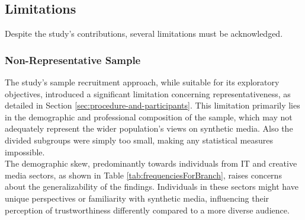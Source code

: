 \documentclass[
  a4paper,  %
  twoside,  %
  bibliography=totoc,
  headsepline,
  cleardoublepage=empty,
  parskip=half,
  draft=false
]{scrbook}
\begin{document}
\subsection{Limitations}
\label{subsec:limitations}
Despite the study's contributions, several limitations must be acknowledged.

\subsubsection{Non-Representative Sample}
The study's sample recruitment approach, while suitable for its exploratory objectives, introduced a significant limitation concerning representativeness, as detailed in Section \ref{sec:procedure-and-participants}. This limitation primarily lies in the demographic and professional composition of the sample, which may not adequately represent the wider population's views on synthetic media. 
Also the divided subgroups were simply too small, making any statistical measures impossible. \\
The demographic skew, predominantly towards individuals from IT and creative media sectors, as shown in Table \ref{tab:frequenciesForBranch}, raises concerns about the generalizability of the findings. Individuals in these sectors might have unique perspectives or familiarity with synthetic media, influencing their perception of trustworthiness differently compared to a more diverse audience.
\end{document}
